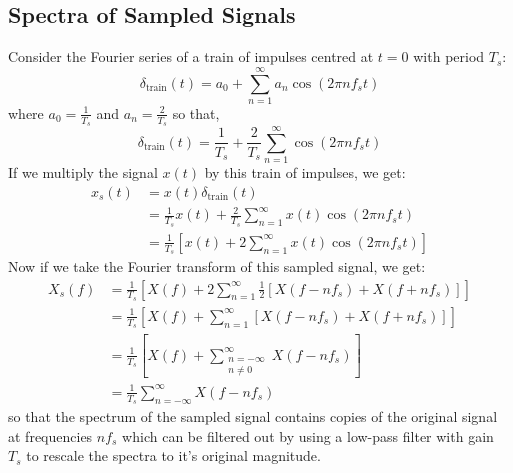 \documentclass{article}
\begin{document}
\subsection{Spectra of Sampled Signals}
Consider the Fourier series of a train of impulses centred at \(t = 0\)
with period \(T_s\):
\begin{equation*}
    \delta_{\mathrm{train}}\left( t \right) = a_0 + \sum_{n = 1}^{\infty} a_n \cos\left( 2\pi n f_s t \right)
\end{equation*}
where \(a_0 = \frac{1}{T_s}\) and \(a_n = \frac{2}{T_s}\) so that,
\begin{equation*}
    \delta_{\mathrm{train}}\left( t \right) = \frac{1}{T_s} + \frac{2}{T_s} \sum_{n = 1}^{\infty} \cos\left( 2\pi n f_s t \right)
\end{equation*}
If we multiply the signal \(x\left( t \right)\) by this train of impulses, we get:
\begin{align*}
    x_s\left( t \right) & = x\left( t \right) \delta_{\mathrm{train}}\left( t \right)                                                                  \\
                        & = \frac{1}{T_s} x\left( t \right) + \frac{2}{T_s} \sum_{n = 1}^{\infty} x\left( t \right) \cos\left( 2\pi n f_s t \right)    \\
                        & = \frac{1}{T_s} \left[ x\left( t \right) + 2 \sum_{n = 1}^{\infty} x\left( t \right) \cos\left( 2\pi n f_s t \right) \right]
\end{align*}
Now if we take the Fourier transform of this sampled signal, we get:
\begin{align*}
    X_s\left( f \right) & = \frac{1}{T_s} \left[ X\left( f \right) + 2 \sum_{n = 1}^\infty \frac{1}{2}\left[ X\left( f - nf_s \right) + X\left( f + nf_s \right) \right] \right] \\
                        & = \frac{1}{T_s} \left[ X\left( f \right) + \sum_{n = 1}^\infty \left[ X\left( f - nf_s \right) + X\left( f + nf_s \right) \right] \right]              \\
                        & = \frac{1}{T_s} \left[ X\left( f \right) + \sum_{\substack{n = -\infty                                                                                 \\ n \neq 0}}^\infty X\left( f - nf_s \right) \right]              \\
                        & = \frac{1}{T_s} \sum_{n = -\infty}^\infty X\left( f - nf_s \right)
\end{align*}
so that the spectrum of the sampled signal contains copies of the original signal at frequencies
\(n f_s\) which can be filtered out by using a low-pass filter with gain \(T_s\) to rescale the spectra to it's original magnitude.
\end{document}
